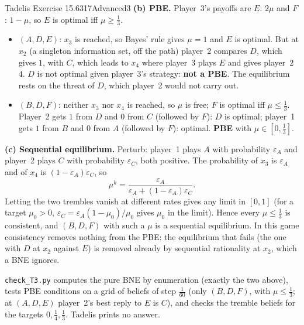 \begin{exsol}{Tadelis Exercise 15.6}{317}{Advanced}{3}
\textbf{(b) PBE.} Player~3's payoffs are $E$: $2\mu$ and $F$: $1 - \mu$, so $E$ is optimal iff $\mu \ge \frac13$.
\begin{itemize}
  \item $(A, D, E)$: $x_3$ is reached, so Bayes' rule gives $\mu = 1$ and $E$ is optimal. But at
  $x_2$ (a singleton information set, off the path) player~2 compares $D$, which gives $1$, with $C$,
  which leads to $x_4$ where player~3 plays $E$ and gives player~2 $4$. $D$ is not optimal given
  player~3's strategy: \textbf{not a PBE}. The equilibrium rests on the threat of $D$,
  which player~2 would not carry out.
  \item $(B, D, F)$: neither $x_3$ nor $x_4$ is reached, so $\mu$ is free; $F$ is optimal iff
  $\mu \le \frac13$. Player~2 gets $1$ from $D$ and $0$ from $C$ (followed by $F$): $D$ is optimal;
  player~1 gets $1$ from $B$ and $0$ from $A$ (followed by $F$): optimal. \textbf{PBE} with
  $\mu \in [0, \frac13]$.
\end{itemize}
\textbf{(c) Sequential equilibrium.} Perturb: player~1 plays $A$ with probability $\varepsilon_A$ and
player~2 plays $C$ with probability $\varepsilon_C$, both positive. The probability of $x_3$ is
$\varepsilon_A$ and of $x_4$ is $(1 - \varepsilon_A)\varepsilon_C$, so
\[
  \mu^k = \frac{\varepsilon_A}{\varepsilon_A + (1-\varepsilon_A)\varepsilon_C}.
\]
Letting the two trembles vanish at different rates gives any limit in $[0, 1]$ (for a target $\mu_0 > 0$,
$\varepsilon_C = \varepsilon_A (1-\mu_0)/\mu_0$ gives $\mu_0$ in the limit). Hence every $\mu \le \frac13$
is consistent, and $(B, D, F)$ with such a $\mu$ is a sequential equilibrium. In this game consistency
removes nothing from the PBE: the equilibrium that fails (the one with $D$ at $x_2$ against $E$) is
removed already by sequential rationality at $x_2$, which a BNE ignores.

\verify \texttt{check\_T3.py} computes the pure BNE by enumeration (exactly the two above),
tests PBE conditions on a grid of beliefs of step $\frac1{60}$ (only $(B,D,F)$, with $\mu \le \frac13$; at
$(A,D,E)$ player~2's best reply to $E$ is $C$), and checks the tremble beliefs for the targets
$0, \frac14, \frac13$. Tadelis prints no answer.

\end{exsol}
